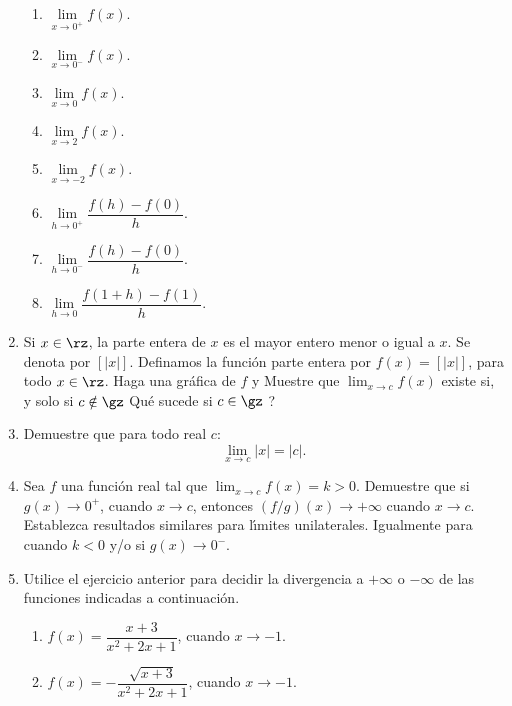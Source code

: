 \begin{enumerate}
\begin{enumerate}
\item $\lim\limits_{x\rightarrow0^{+}}f(x)$.

\item $\lim\limits_{x\rightarrow0^{-}}f(x)$.

\item $\lim\limits_{x\rightarrow0}f(x)$.

\item $\lim\limits_{x\rightarrow2}f(x)$.

\item $\lim\limits_{x\rightarrow-2}f(x)$.

\item $\lim\limits_{h\rightarrow0^{+}}\dfrac{f(h)-f(0)}{h}$.

\item $\lim\limits_{h\rightarrow0^{-}}\dfrac{f(h)-f(0)}{h}$.

\item $\lim\limits_{h\rightarrow0}\dfrac{f(1+h)-f(1)}{h}$.
\end{enumerate}

\item Si $x\in\rz$, la parte entera de $x$ es el mayor entero menor o igual a
$x$. Se denota por $[|x|]$. Definamos la funci\'{o}n parte entera por
$f(x)=[|x|]$, para todo $x\in\rz$. Haga una gr\'{a}fica de $f$ y Muestre que
$\lim_{x\rightarrow c}f(x)$ existe si, y solo si $c\notin\gz$
\textquestiondown Qu\'{e} sucede si $c\in\gz$ ?

\item Demuestre que para todo real $c$:
\[
\lim_{x\rightarrow c}|x|=|c|.
\]


\item Sea $f$ una funci\'{o}n real tal que $\lim_{x\rightarrow c}f(x)=k>0$.
Demuestre que si $g(x)\rightarrow0^{+}$, cuando $x\rightarrow c$, entonces
$(f/g)(x)\rightarrow+\infty$ cuando $x\rightarrow c$. Establezca resultados
similares para l\'{\i}mites unilaterales. Igualmente para cuando $k<0$ y/o si
$g(x)\rightarrow0^{-}$.

\item Utilice el ejercicio anterior para decidir la divergencia a $+\infty$ o
$-\infty$ de las funciones indicadas a continuaci\'{o}n.

\begin{enumerate}
\item $f(x)=\dfrac{x+3}{x^{2}+2x+1}$, cuando $x\rightarrow-1$.

\item $f(x)=-\dfrac{\sqrt{x+3}}{x^{2}+2x+1}$, cuando $x\rightarrow-1$.


\end{enumerate}
\end{enumerate}
